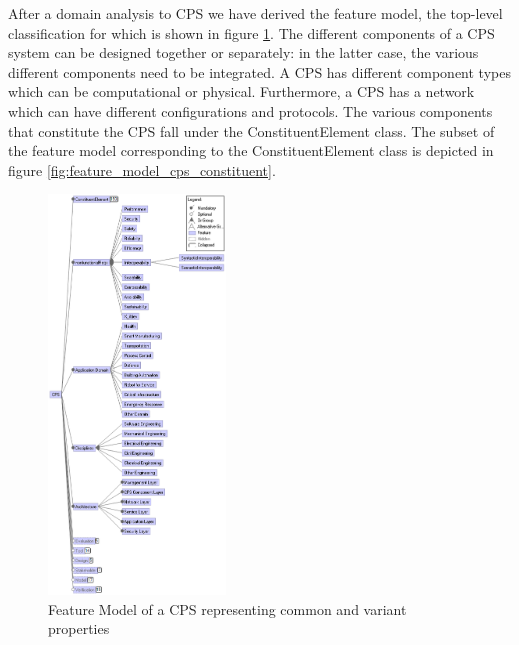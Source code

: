 \documentclass[final]{include/MPM4CPS/MPM4CPS-Report} %
\newcommand{\uidx}[1]{\index[used]{#1}}  %
\begin{document}
After a domain analysis to CPS we have derived the feature model, the top-level classification for which is shown in
figure \ref{fig:feature_model_cps_top}. The different components\uidx{Component} of a CPS system can be designed together or
separately: in the latter case, the various different components need to be integrated. A CPS has different component types which can be computational or physical. Furthermore, a CPS has a network which can have different configurations and protocols.
The various components that constitute the CPS fall under the ConstituentElement class. The subset of the feature model corresponding to the ConstituentElement class is depicted in figure \ref{fig:feature_model_cps_constituent}.
\begin{figure}[!htb]
\includegraphics[width=0.42\textwidth]{figures/cps-ontology-top.png}  %
\caption{Feature Model of a CPS representing common and variant properties}
\label{fig:feature_model_cps_top}
\end{figure}
\end{document}
